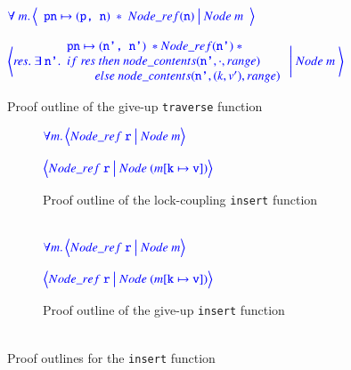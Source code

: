 \documentclass[a4paper,UKenglish,cleveref, autoref, thm-restate]{lipics-v2021}
\newcommand{\treerep}{\ensuremath{\mathsf{Node}}}
\newcommand{\nodeboxrep}{\ensuremath{\mathsf{Node\_ref}}}
\begin{document}
\begin{figure}[!ht]
	$\color{blue}
	\forall \  m. \left\langle
	\begin{array}{c}
		\texttt{pn} \mapsto (\texttt{p, n}) \ \ast \ \nodeboxrep(\texttt{n}) \ \big| \ \treerep\ m
	\end{array}
	\right\rangle$
		
	$\color{blue}
	\left\langle \mathit{res}. \ \exists \  \texttt{n'}.
	\begin{array}{l} \texttt{pn} \mapsto (\texttt{n', n'}) \ \ast \nodeboxrep(\texttt{n'}) \ \ast \ 
		\\ 
		\mathsf{if} \ \mathit{res} \ \mathsf{then} \ \mathsf{node\_contents}(\texttt{n'}, \cdot, \mathsf{range}) \ 
		\\ \ \ \ \ \ \ \ \ \ \mathsf{else} \ \mathsf{node\_contents}(\texttt{n'}, (\mathsf{k}, \mathsf{v'}), \mathsf{range})
	\end{array}
	\ \Bigg| \ \treerep\ m \
	\right\rangle$
	\caption{Proof outline of the give-up \texttt{traverse} function}
	\label{proof_giveup_traverse}
\end{figure}


\begin{figure}[!ht]
	\begin{subfigure}{\textwidth}
		$\color{blue}
		\forall m.\left\langle 
		\nodeboxrep\ \texttt{r} \ \big | \ \treerep\ m
		\right\rangle$
		
		$\color{blue}
		\left\langle 
		\nodeboxrep\ \texttt{r} \ \big | \ \treerep\ (m[\texttt{k} \mapsto \texttt{v}])
		\right\rangle$
		\caption{Proof outline of the lock-coupling \texttt{insert} function \\\\}
		\label{proof_lock_insert}	
	\end{subfigure}\qquad
	\begin{subfigure}{\textwidth}
		$\color{blue}
		\forall m.\left\langle 
		\nodeboxrep\ \texttt{r} \ \big | \ \treerep\ m
		\right\rangle$
		
		$\color{blue}
		\left\langle 
		\nodeboxrep\ \texttt{r} \ \big | \ \treerep\ (m[\texttt{k} \mapsto \texttt{v}])
		\right\rangle$
		\caption{Proof outline of the give-up \texttt{insert} function \\\\}
		\label{proof_giveup_insert}
	\end{subfigure}
	\caption{Proof outlines for the \texttt{insert} function}
	\label{proof_lock_giveup_insert}
\end{figure}
\end{document}
